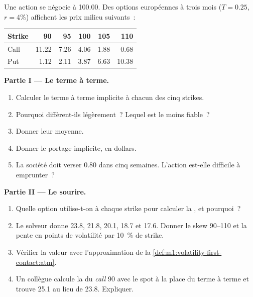 \begin{problem}\label{pb:m1:volatility-first-contact:1}
Une action se négocie à 100.00. Des options européennes à trois mois ($T = 0.25$, $r = 4\%$)
affichent les prix milieu suivants~:

\begin{center}\small
\begin{tabular}{lrrrrr}
\toprule
Strike & 90 & 95 & 100 & 105 & 110 \\
\midrule
Call & 11.22 & 7.26 & 4.06 & 1.88 & 0.68 \\
Put & 1.12 & 2.11 & 3.87 & 6.63 & 10.38 \\
\bottomrule
\end{tabular}
\end{center}

\medskip\noindent\textbf{Partie I --- Le terme à terme.}
\begin{enumerate}
\item Calculer le terme à terme implicite à chacun des cinq strikes.
\item Pourquoi diffèrent-ils légèrement~? Lequel est le moins fiable~?
\item Donner leur moyenne.
\item Donner le portage implicite, en dollars.
\item La société doit verser 0.80 dans cinq semaines. L'action est-elle
difficile à emprunter~?
\end{enumerate}

\medskip\noindent\textbf{Partie II --- Le sourire.}
\begin{enumerate}[resume]
\item Quelle option utilise-t-on à chaque strike pour calculer la ,
et pourquoi~?
\item Le solveur donne 23.8, 21.8, 20.1, 18.7 et 17.6. Donner le skew 90--110
et la pente en points de volatilité par 10~\% de strike.
\item Vérifier la valeur  avec l'approximation de
la \cref{def:m1:volatility-first-contact:atm}.
\item Un collègue calcule la  du \emph{call} 90 avec le spot
à la place du terme à terme et trouve 25.1 au lieu de 23.8. Expliquer.
\end{enumerate}


\end{problem}
